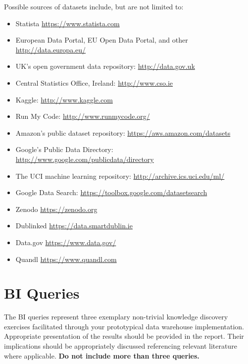 \documentclass{article}[a4paper,12pt]
\begin{document}
Possible sources of datasets include, but are not limited to:

\begin{itemize}
\item Statista \url{https://www.statista.com}
\item European Data Portal, EU Open Data Portal, and other \url{http://data.europa.eu/}  
\item UK’s open government data repository: \url{http://data.gov.uk} 
\item Central Statistics Office, Ireland: \url{http://www.cso.ie} 
\item Kaggle: \url{http://www.kaggle.com} 
\item Run My Code: \url{http://www.runmycode.org/} 
\item Amazon’s public dataset repository: 
\url{https://aws.amazon.com/datasets}
\item Google’s Public Data Directory: \url{http://www.google.com/publicdata/directory} 
\item The UCI machine learning repository: \url{http://archive.ics.uci.edu/ml/} 
\item Google Data Search: \url{https://toolbox.google.com/datasetsearch}
\item Zenodo \url{https://zenodo.org} 
\item Dublinked \url{https://data.smartdublin.ie}
\item Data.gov \url{https://www.data.gov/}
\item Quandl \url{https://www.quandl.com}
\end{itemize}

\section{BI Queries}
The BI queries represent three exemplary non-trivial knowledge discovery exercises facilitated through your prototypical data warehouse implementation. Appropriate presentation of the results should be provided in the report. Their implications should be appropriately discussed referencing relevant literature where applicable. \textbf{Do not include more than three queries.}
\end{document}
